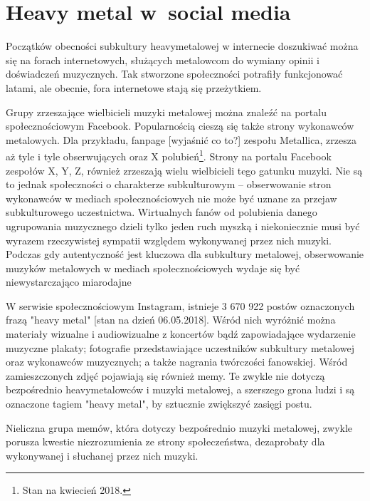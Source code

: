 \documentclass[12pt, a4paper, titlepage]{report}
\begin{document}



\section{Heavy metal w~social media}
Początków obecności subkultury heavymetalowej w internecie doszukiwać można się na forach internetowych, służących metalowcom do wymiany opinii i doświadczeń muzycznych. Tak stworzone społeczności potrafiły funkcjonować latami, ale obecnie, fora internetowe stają się przeżytkiem. 

Grupy zrzeszające wielbicieli muzyki metalowej można znaleźć na portalu społecznościowym Facebook. Popularnością cieszą się także strony wykonawców metalowych. Dla przykładu, fanpage [wyjaśnić co to?] zespołu Metallica, zrzesza aż tyle i tyle obserwujących oraz X polubień\footnote{Stan na kwiecień 2018.}. Strony na portalu Facebook zespołów X, Y, Z, również zrzeszają wielu wielbicieli tego gatunku muzyki. Nie są to jednak społeczności o charakterze subkulturowym -- obserwowanie stron wykonawców w mediach społecznościowych nie może być uznane za przejaw subkulturowego uczestnictwa. Wirtualnych fanów od polubienia danego ugrupowania muzycznego dzieli tylko jeden ruch myszką i niekoniecznie musi być wyrazem rzeczywistej sympatii względem wykonywanej przez nich muzyki. Podczas gdy autentyczność jest kluczowa dla subkultury metalowej, obserwowanie muzyków metalowych w mediach społecznościowych wydaje się być niewystarczająco miarodajne %

W serwisie społecznościowym Instagram, istnieje 3 670 922 postów oznaczonych frazą "heavy metal" [stan na dzień 06.05.2018]. Wśród nich wyróżnić można materiały wizualne i audiowizualne z koncertów bądź zapowiadające wydarzenie muzyczne plakaty; fotografie przedstawiające uczestników subkultury metalowej oraz wykonawców muzycznych; a także nagrania twórczości fanowskiej. Wśród zamieszczonych zdjęć pojawiają się również memy. Te zwykle nie dotyczą bezpośrednio heavymetalowców i muzyki metalowej, a szerszego grona ludzi i są oznaczone tagiem "heavy metal", by sztucznie zwiększyć zasięgi postu. 

Nieliczna grupa memów, która dotyczy bezpośrednio muzyki metalowej, zwykle porusza kwestie niezrozumienia ze strony społeczeństwa, dezaprobaty dla wykonywanej i słuchanej przez nich muzyki. 
\end{document}
